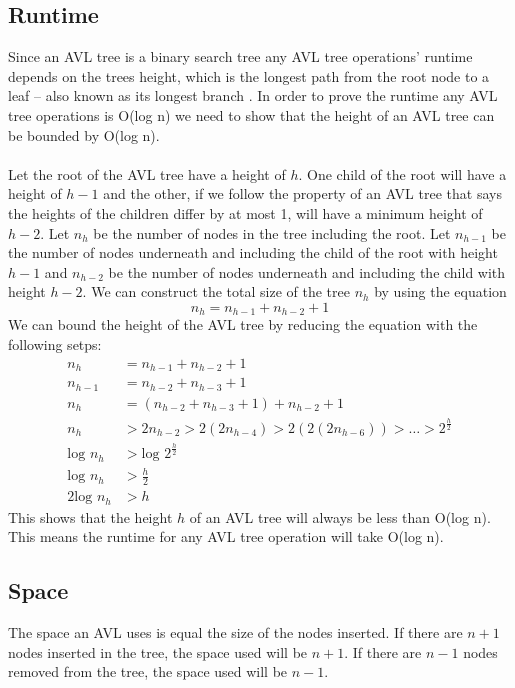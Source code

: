 \documentclass[12pt]{article}
\begin{document}
\subsection*{Runtime}
Since an AVL tree is a binary search tree any AVL tree operations' runtime
depends on the trees height, which is the longest path from the root node to a
leaf -- also known as its longest branch \cite{avl-runtime}.  In order to prove
the runtime any AVL tree operations is O(log n) we need to show that the height of an AVL tree
can be bounded by O(log n).\\
\\
Let the root of the AVL tree have a height of $h$.  
One child of the root will have a height of $h-1$ and the other, if we follow 
the property of an AVL tree that says the heights of the children differ by at 
most 1, will have a minimum height of $h-2$.  Let $n_h$ be the number of nodes
in the tree including the root.  Let $n_{h-1}$ be the number of nodes underneath
and including the child of the root with height $h-1$ and $n_{h-2}$ be the
number of nodes underneath and including the child with height $h-2$.  We can
construct the total size of the tree $n_h$ by using the equation
$$
n_h = n_{h-1} + n_{h-2} + 1
$$
We can bound the height of the AVL tree by reducing the equation with the
following setps:
\begin{align}
n_h &= n_{h-1} + n_{h-2} + 1\\
n_{h-1} &= n_{h-2} + n_{h-3} + 1\\
n_h &= (n_{h-2} + n_{h-3} + 1) + n_{h-2} + 1\\
n_h &> 2n_{h-2} > 2(2n_{h-4}) > 2(2(2n_{h-6})) > \ldots > 2^{\frac{h}{2}}\\
\text{log }n_h &> \text{log }2^{\frac{h}{2}}\\
\text{log }n_h &> \frac{h}{2}\\
2\text{log }n_h &> h
\end{align}
This shows that the height $h$ of an AVL tree will always be less than O(log n).
This means the runtime for any AVL tree operation will take O(log n).
\subsection*{Space}
The space an AVL uses is equal the size of the nodes inserted.  If
there are $n + 1$ nodes inserted in the tree, the space used will be $n + 1$. 
If there are $n - 1$ nodes removed from the tree, the space used will be $n-1$.
\end{document}
